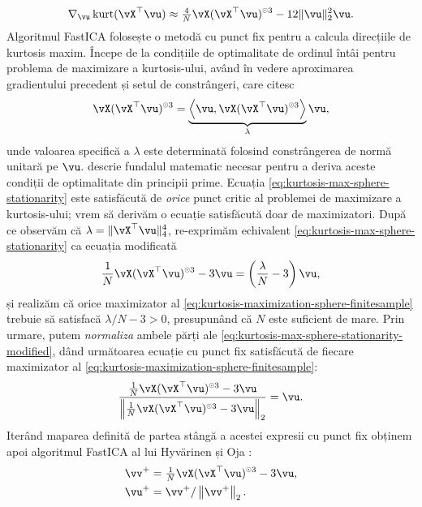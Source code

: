 \documentclass[../../book-main_ro.tex]{subfiles}
\begin{document}
\begin{equation*}
    \nabla_{\vu} \kurt(\vX^\top \vu)
    \approx
    \tfrac{4}{N} \vX (\vX^\top \vu)^{\hada 3}
    - 12 \norm{\vu}_2^2 \vu.
\end{equation*}
Algoritmul FastICA folosește o metodă cu punct fix pentru a calcula direcțiile de kurtosis maxim. Începe de la condițiile de optimalitate de ordinul întâi pentru problema de maximizare a kurtosis-ului, având în vedere aproximarea gradientului precedent și setul de constrângeri, care citesc
\begin{align}\label{eq:kurtosis-max-sphere-stationarity}
   \vX (\vX^\top \vu)^{\hada 3} 
   = 
   \underbrace{
   \ip*{\vu}{
   \vX (\vX^\top \vu)^{\hada 3} 
   }}_{\lambda} \vu,
\end{align}
unde valoarea specifică a $\lambda$ este determinată folosind constrângerea de normă unitară pe $\vu$.
 descrie fundalul matematic necesar pentru a deriva aceste condiții de optimalitate din principii prime.
Ecuația \eqref{eq:kurtosis-max-sphere-stationarity} este satisfăcută de \textit{orice} punct critic al problemei de maximizare a kurtosis-ului; vrem să derivăm o ecuație satisfăcută doar de maximizatori.
După ce observăm că $\lambda = \norm{\vX^\top \vu}_4^4$, re-exprimăm echivalent \eqref{eq:kurtosis-max-sphere-stationarity} ca ecuația modificată
\begin{align}\label{eq:kurtosis-max-sphere-stationarity-modified}
   \frac{1}{N}\vX (\vX^\top \vu)^{\hada 3} 
   - 
   3 \vu
   = 
   \left(
   \frac{\lambda}{N} - 3
   \right)
   \vu,
\end{align}
și realizăm că orice maximizator al \eqref{eq:kurtosis-maximization-sphere-finitesample} 
trebuie să satisfacă $\lambda / N - 3 > 0$,
presupunând că $N$ este suficient de mare.
Prin urmare, putem \textit{normaliza} ambele părți ale \eqref{eq:kurtosis-max-sphere-stationarity-modified},
dând următoarea ecuație cu punct fix satisfăcută de fiecare maximizator al \eqref{eq:kurtosis-maximization-sphere-finitesample}:
\begin{align}\label{eq:kurtosis-max-sphere-fxp}
\frac{
   \frac{1}{N}\vX (\vX^\top \vu)^{\hada 3} 
   - 
   3 \vu
   }{
   \norm*{
   \frac{1}{N}\vX (\vX^\top \vu)^{\hada 3} 
   - 
   3 \vu
   }_2
   }
   =
   \vu.
\end{align}
Iterând maparea definită de partea stângă a acestei expresii cu punct fix obținem apoi algoritmul FastICA al lui Hyv\"{a}rinen și Oja \cite{hyvarinen-1997}:
\begin{equation}
\begin{split}\label{eq:fast-ica}
   \vv^+ &= \tfrac{1}{N}\vX (\vX^\top \vu)^{\hada 3}- 3 \vu
   ,  \\
   \vu^+ &= \vv^+ / \norm*{\vv^+}_2.
   \end{split}
\end{equation}
\end{document}
